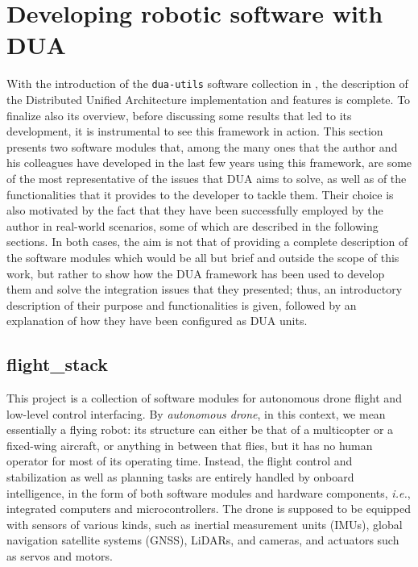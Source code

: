\section{Developing robotic software with DUA}
\label{sec:dua_modules}
With the introduction of the \texttt{dua-utils} software collection in , the description of the Distributed Unified Architecture implementation and features is complete. To finalize also its overview, before discussing some results that led to its development, it is instrumental to see this framework in action. This section presents two software modules that, among the many ones that the author and his colleagues have developed in the last few years using this framework, are some of the most representative of the issues that DUA aims to solve, as well as of the functionalities that it provides to the developer to tackle them. Their choice is also motivated by the fact that they have been successfully employed by the author in real-world scenarios, some of which are described in the following sections. In both cases, the aim is not that of providing a complete description of the software modules which would be all but brief and outside the scope of this work, but rather to show how the DUA framework has been used to develop them and solve the integration issues that they presented; thus, an introductory description of their purpose and functionalities is given, followed by an explanation of how they have been configured as DUA units.

\subsection{flight\_stack}
\label{sec:dua_modules_flight_stack}
This project is a collection of software modules for autonomous drone flight and low-level control interfacing. By \emph{autonomous drone}, in this context, we mean essentially a flying robot: its structure can either be that of a multicopter or a fixed-wing aircraft, or anything in between that flies, but it has no human operator for most of its operating time. Instead, the flight control and stabilization as well as planning tasks are entirely handled by onboard intelligence, in the form of both software modules and hardware components, \emph{i.e.}, integrated computers and microcontrollers. The drone is supposed to be equipped with sensors of various kinds, such as inertial measurement units (IMUs), global navigation satellite systems (GNSS), LiDARs, and cameras, and actuators such as servos and motors.

